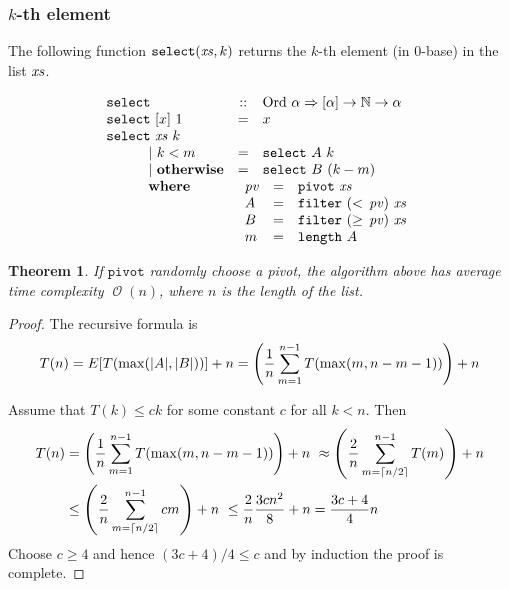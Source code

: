 \documentclass[12pt, a4paper]{article}
\DeclarePairedDelimiter{\abs}{\lvert}{\rvert}
\DeclarePairedDelimiter{\ceil}{\lceil}{\rceil}
\newcommand{\opord}{\operatorname{\mathcal{O}}}
\newcommand{\ord}[1]{\opord\left(#1\right)}
\newtheorem{theorem}{Theorem}
\begin{document}
\subsubsection{$k$-th element}
The following function $\mathtt{select}(\mathit{xs}, k)$ returns the $k$-th element (in $0$-base) in the list $\mathit{xs}$.

\[
  \begin{array}{lcl}
    \mathtt{select} & :: & \text{Ord } \alpha \Rightarrow [\alpha] \to \mathbb{N} \to \alpha \\
    \mathtt{select} \ [x] \ 1 & = & x \\
    \mathtt{select} \ \xs \ k & & \\
    \hspace*{30pt} | \ k < m    & = & \mathtt{select} \ A \ k \\
    \hspace*{30pt} | \ \text{\bf otherwise}    & = & \mathtt{select} \ B \ (k - m) \\
    \hspace*{30pt} \text{\bf where} & \multicolumn{2}{l}{
      \begin{array}[t]{lcl}
        \pv & = & \mathtt{pivot} \ \xs \\
        A & = & \mathtt{filter} \ (< \,\pv) \ \xs \\
        B & = & \mathtt{filter} \ (\geq \,\pv) \ \xs \\
        m & = & \mathtt{length} \ A
      \end{array}
    }
  \end{array}
\]

\begin{theorem}
  If $\mathtt{pivot}$ randomly choose a pivot, the algorithm above has average time complexity $\ord{n}$, 
  where $n$ is the length of the list.
\end{theorem}

\begin{proof}
  The recursive formula is 
  \[ T(n) = E[T(\max (\abs{A}, \abs{B}))] + n = 
    \left( \frac{1}{n} \sum_{m=1}^{n-1} T(\max(m, n-m-1)) \right) + n  \]
  
  Assume that $T(k) \leq ck$ for some constant $c$ for all $k < n$. Then
  \begin{align*}
    T(n) &= \left( \frac{1}{n} \sum_{m=1}^{n-1} T(\max(m, n-m-1)) \right) + n \  
    \approx \left( \frac{2}{n} \sum_{m=\ceil{n/2}}^{n-1} T(m) \right) + n \\
    &\leq \left( \frac{2}{n} \sum_{m=\ceil{n/2}}^{n-1} cm \right) + n \ 
    \leq \frac{2}{n} \frac{3cn^2}{8} + n = \frac{3c + 4}{4} n
  \end{align*}
  Choose $c \geq 4$ and hence $(3c+4)/4 \leq c$ and by induction the proof is complete.
\end{proof}
\end{document}
